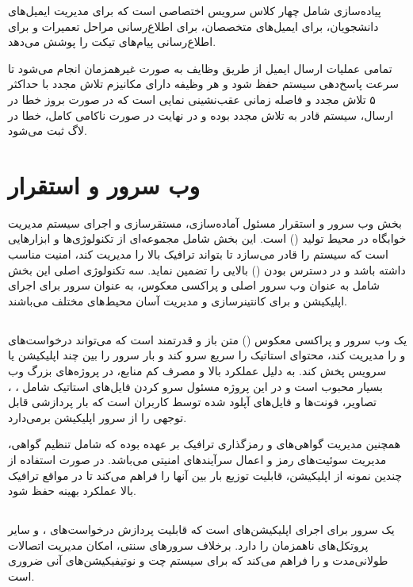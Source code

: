 \documentclass[12pt,a4paper]{report}
\begin{document}
	پیاده‌سازی شامل چهار کلاس سرویس اختصاصی است که  برای مدیریت ایمیل‌های دانشجویان،  برای ایمیل‌های متخصصان،  برای اطلاع‌رسانی مراحل تعمیرات و  برای اطلاع‌رسانی پیام‌های تیکت را پوشش می‌دهد.
	
	تمامی عملیات ارسال ایمیل از طریق وظایف  به صورت غیرهمزمان انجام می‌شود تا سرعت پاسخ‌دهی سیستم حفظ شود و هر وظیفه دارای مکانیزم تلاش مجدد با حداکثر ۵ تلاش مجدد و فاصله زمانی عقب‌نشینی نمایی است که در صورت بروز خطا در ارسال، سیستم قادر به تلاش مجدد بوده و در نهایت در صورت ناکامی کامل، خطا در لاگ ثبت می‌شود.
	
	\section{وب سرور و استقرار}
	بخش وب سرور و استقرار مسئول آماده‌سازی، مستقرسازی و اجرای سیستم مدیریت خوابگاه در محیط تولید () است. این بخش شامل مجموعه‌ای از تکنولوژی‌ها و ابزارهایی است که سیستم را قادر می‌سازد تا بتواند ترافیک بالا را مدیریت کند، امنیت مناسب داشته باشد و در دسترس بودن () بالایی را تضمین نماید. سه تکنولوژی اصلی این بخش شامل  به عنوان وب سرور اصلی و پراکسی معکوس،  به عنوان سرور  برای اجرای اپلیکیشن  و  برای کانتینرسازی و مدیریت آسان محیط‌های مختلف می‌باشند.
	
	\subsection{}
	یک وب سرور و پراکسی معکوس () متن باز و قدرتمند است که می‌تواند درخواست‌های  و  را مدیریت کند، محتوای استاتیک را سریع سرو کند و بار سرور را بین چند اپلیکیشن یا سرویس پخش کند. به دلیل عملکرد بالا و مصرف کم منابع،  در پروژه‌های بزرگ وب بسیار محبوب است و در این پروژه مسئول سرو کردن فایل‌های استاتیک شامل ، ، تصاویر، فونت‌ها و فایل‌های آپلود شده توسط کاربران است که بار پردازشی قابل توجهی را از سرور اپلیکیشن  برمی‌دارد.
	
	همچنین مدیریت گواهی‌های  و رمزگذاری ترافیک  بر عهده  بوده که شامل تنظیم گواهی، مدیریت سوئیت‌های رمز و اعمال سرآیندهای امنیتی می‌باشد. در صورت استفاده از چندین نمونه از اپلیکیشن،  قابلیت توزیع بار بین آنها را فراهم می‌کند تا در مواقع ترافیک بالا عملکرد بهینه حفظ شود.
	
	\subsection{}
	 یک سرور  برای اجرای اپلیکیشن‌های  است که قابلیت پردازش درخواست‌های ،  و سایر پروتکل‌های ناهمزمان را دارد. برخلاف سرورهای  سنتی،  امکان مدیریت اتصالات طولانی‌مدت و  را فراهم می‌کند که برای سیستم چت و نوتیفیکیشن‌های آنی ضروری است.
	
\end{document}
